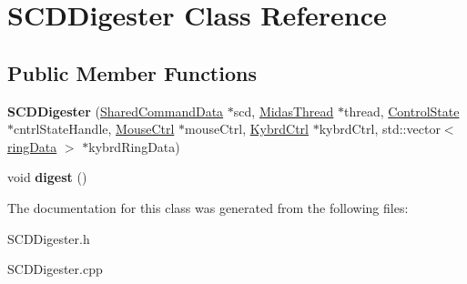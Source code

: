 \hypertarget{class_s_c_d_digester}{\section{S\+C\+D\+Digester Class Reference}
\label{class_s_c_d_digester}
}
\subsection*{Public Member Functions}
\begin{DoxyCompactItemize}
\item 
\hypertarget{class_s_c_d_digester_a0c44bfc57617bcf2cebd469b3ced85ad}{{\bfseries S\+C\+D\+Digester} (\hyperlink{class_shared_command_data}{Shared\+Command\+Data} $\ast$scd, \hyperlink{class_midas_thread}{Midas\+Thread} $\ast$thread, \hyperlink{class_control_state}{Control\+State} $\ast$cntrl\+State\+Handle, \hyperlink{class_mouse_ctrl}{Mouse\+Ctrl} $\ast$mouse\+Ctrl, \hyperlink{class_kybrd_ctrl}{Kybrd\+Ctrl} $\ast$kybrd\+Ctrl, std\+::vector$<$ \hyperlink{classring_data}{ring\+Data} $>$ $\ast$kybrd\+Ring\+Data)}\label{class_s_c_d_digester_a0c44bfc57617bcf2cebd469b3ced85ad}

\item 
\hypertarget{class_s_c_d_digester_a799635f57efa9954cdbe3fae86f33313}{void {\bfseries digest} ()}\label{class_s_c_d_digester_a799635f57efa9954cdbe3fae86f33313}

\end{DoxyCompactItemize}


The documentation for this class was generated from the following files\+:\begin{DoxyCompactItemize}
\item 
S\+C\+D\+Digester.\+h\item 
S\+C\+D\+Digester.\+cpp\end{DoxyCompactItemize}
